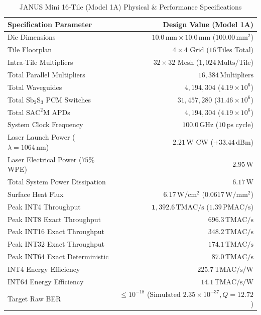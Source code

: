 \documentclass[journal]{IEEEtran}
\begin{document}
\begin{table}[!htbp]
\centering
\footnotesize
\caption{JANUS Mini 16-Tile (Model 1A) Physical \& Performance Specifications}
\label{tab:model_1a_specs}
\begin{tabularx}{\columnwidth}{>{\raggedright\arraybackslash}X r}
\toprule
\textbf{Specification Parameter} & \textbf{Design Value (Model 1A)} \\
\midrule
Die Dimensions & $10.0\,\mathrm{mm} \times 10.0\,\mathrm{mm}$ ($100.00\,\mathrm{mm^2}$) \\
Tile Floorplan & $4 \times 4$ Grid ($16\,\mathrm{Tiles}$ Total) \\
Intra-Tile Multipliers & $32 \times 32$ Mesh ($1,024\,\mathrm{Mults/Tile}$) \\
Total Parallel Multipliers & $16,384\,\mathrm{Multipliers}$ \\
Total Waveguides & $4,194,304$ ($4.19\times 10^6$) \\
Total $\mathrm{Sb_2S_3}$ PCM Switches & $31,457,280$ ($31.46\times 10^6$) \\
Total $\mathrm{SAC^2M}$ APDs & $4,194,304$ ($4.19\times 10^6$) \\
System Clock Frequency & $100.0\,\mathrm{GHz}$ ($10\,\mathrm{ps}$ cycle) \\
Laser Launch Power ($\lambda=1064\,\mathrm{nm}$) & $2.21\,\mathrm{W}$ CW ($+33.44\,\mathrm{dBm}$) \\
Laser Electrical Power ($75\%$ WPE) & $2.95\,\mathrm{W}$ \\
Total System Power Dissipation & $\mathbf{6.17\,\mathrm{W}}$ \\
Surface Heat Flux & $6.17\,\mathrm{W/cm^2}$ ($0.0617\,\mathrm{W/mm^2}$) \\
\midrule
Peak INT4 Throughput & $\mathbf{1,392.6\,\mathrm{TMAC/s}}$ ($1.39\,\mathrm{PMAC/s}$) \\
Peak INT8 Exact Throughput & $696.3\,\mathrm{TMAC/s}$ \\
Peak INT16 Exact Throughput & $348.2\,\mathrm{TMAC/s}$ \\
Peak INT32 Exact Throughput & $174.1\,\mathrm{TMAC/s}$ \\
Peak INT64 Exact Deterministic & $\mathbf{87.0\,\mathrm{TMAC/s}}$ \\
\midrule
INT4 Energy Efficiency & $\mathbf{225.7\,\mathrm{TMAC/s/W}}$ \\
INT64 Energy Efficiency & $\mathbf{14.1\,\mathrm{TMAC/s/W}}$ \\
Target Raw BER & $\le 10^{-18}$ ($\text{Simulated } 2.35 \times 10^{-37}, Q = 12.72$) \\
\bottomrule
\end{tabularx}
\end{table}
\end{document}
